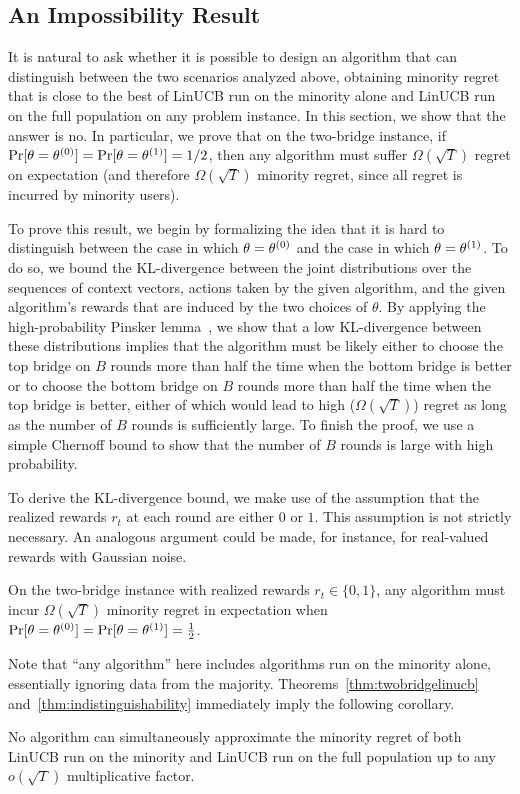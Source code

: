 \subsection{An Impossibility Result}
\label{sec:impossibility}

It is natural to ask whether it is possible to design an algorithm
that can distinguish between the two scenarios analyzed above,
obtaining minority regret that is close to the best of LinUCB run on
the minority alone and LinUCB run on the full population on any
problem instance. In this section, we show that the answer is no. In
particular, we prove that on the two-bridge instance, if
$\Pr[\theta = \theta^{(0)}] = \Pr[\theta = \theta^{(1)}] = 1/2$, then any
algorithm must suffer $\Omega(\sqrt{T})$ regret on expectation (and
therefore $\Omega(\sqrt{T})$ minority regret, since all regret is
incurred by minority users).

To prove this result, we begin by formalizing the idea that it is hard
to distinguish between the case in which $\theta = \theta^{(0)}$ and the
case in which $\theta = \theta^{(1)}$. To do so, we bound the
KL-divergence between the joint distributions over the sequences of
context vectors, actions taken by the given algorithm, and the given
algorithm's rewards that are induced by the two choices of $\theta$.
By applying the high-probability Pinsker lemma~\citep{T09}, we show
that a low KL-divergence between these distributions implies that the
algorithm must be likely either to choose the top bridge on $B$ rounds
more than half the time when the bottom bridge is better or to choose the
bottom bridge on $B$ rounds more than half the time when the top
bridge is better, either of which would lead to high
($\Omega(\sqrt{T})$) regret as long as the number of $B$ rounds is
sufficiently large. To finish the proof, we use a simple Chernoff
bound to show that the number of $B$ rounds is large with high
probability.

To derive the KL-divergence bound, we make use of the assumption that
the realized rewards $r_t$ at each round are either $0$ or $1$.  This
assumption is not strictly necessary.  An analogous argument could be
made, for instance, for real-valued rewards with Gaussian noise.

\begin{theorem} \label{thm:indistinguishability}
On the two-bridge instance with realized rewards $r_t \in \{0,1\}$, any algorithm must incur $\Omega(\sqrt{T})$ minority regret
in expectation when $\Pr[\theta = \theta^{(0)}] = \Pr[\theta = \theta^{(1)}] = \tfrac12$.
\end{theorem}

Note that ``any algorithm'' here includes algorithms run on the
minority alone, essentially ignoring data from the majority.
Theorems~\ref{thm:twobridgelinucb} and~\ref{thm:indistinguishability}
immediately imply the following corollary.

\begin{corollary}
No algorithm can simultaneously approximate the minority regret of both LinUCB run on the minority and LinUCB run on the full population up to any $o(\sqrt{T})$ multiplicative factor.
\end{corollary}
